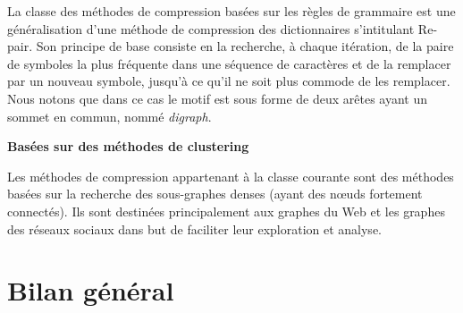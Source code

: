 \documentclass[a4paper,oneside,12pt]{report}
\theoremstyle{definition}
\begin{document}
								La classe des méthodes de compression basées sur les règles de grammaire est une généralisation d'une méthode de compression des dictionnaires s'intitulant Re-pair. Son principe de base consiste en la  recherche, à chaque itération, de la paire de symboles la plus fréquente dans une séquence de caractères et de la remplacer par un nouveau symbole, jusqu'à ce qu'il ne soit plus commode de les remplacer. Nous notons que dans ce cas le motif est sous forme de deux arêtes ayant un sommet en commun, nommé \textit{digraph}.
								
								
								
								
							
								
								

								
								
						 \textbf{Basées sur des méthodes de clustering}
						 
						 		Les méthodes de compression appartenant à la classe courante sont des méthodes basées sur la recherche des sous-graphes denses (ayant des nœuds fortement connectés). Ils sont destinées principalement aux graphes du Web et les graphes des réseaux sociaux dans but de faciliter leur exploration et analyse.
								
								
								
							
						
												
								
		\section{Bilan général}
	

\end{document}
